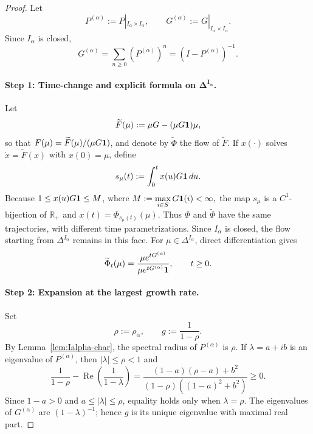 \documentclass[10pt,letterpaper]{article}
\theoremstyle{compactplain}
\theoremstyle{compactdefinition}
\newcommand{\1}{\mathds{1}}
\begin{document}
\begin{proof}
Let
\[
P^{(\alpha)}:=P|_{I_\alpha\times I_\alpha},
\qquad
G^{(\alpha)}:=G|_{I_\alpha\times I_\alpha}.
\]
Since $I_\alpha$ is closed,
\[
G^{(\alpha)}
=
\sum_{n\geq0}(P^{(\alpha)})^n
=
(I-P^{(\alpha)})^{-1}.
\]

\paragraph{Step 1: Time-change and explicit formula on $\boldsymbol{\Delta^{I_\alpha}}$.}
Let
\[
\widetilde F(\mu):=\mu G-(\mu G{\bf 1})\mu,
\]
so that $F(\mu)=\widetilde F(\mu)/(\mu G{\bf 1})$, and denote by
$\widetilde\Phi$ the flow of $\widetilde F$. If $x(\cdot)$ solves
$\dot x=\widetilde F(x)$ with $x(0)=\mu$, define
\[
s_\mu(t):=\int_0^t x(u)G{\bf 1}\,du.
\]
Because $1\leq x(u)G{\bf 1}\leq M$, where
\(
M:=\max\limits_{i\in S}G{\bf 1}(i)<\infty,
\)
the map $s_\mu$ is a $C^1$-bijection of $\mathbb R_+$ and
$x(t)=\Phi_{s_\mu(t)}(\mu)$. Thus $\Phi$ and $\widetilde\Phi$ have the same
trajectories, with different time parametrizations. Since $I_\alpha$ is
closed, the flow starting from $\Delta^{I_\alpha}$ remains in this face. For
$\mu\in\Delta^{I_\alpha}$, direct differentiation gives
\[
\widetilde\Phi_t(\mu)
=
\frac{\mu e^{tG^{(\alpha)}}}
     {\mu e^{tG^{(\alpha)}}{\bf 1}},
\qquad t\geq0.
\]


\paragraph{Step 2: Expansion at the largest growth rate.}
Set
\[
\rho:=\rho_\alpha,
\qquad
g:=\frac{1}{1-\rho}.
\]
By Lemma~\ref{lem:Ialpha-char}, the spectral radius of $P^{(\alpha)}$ is
$\rho$. If $\lambda=a+ib$ is an eigenvalue of $P^{(\alpha)}$, then
$|\lambda|\leq\rho<1$ and
\[
\frac{1}{1-\rho}
-
\operatorname{Re}\left(\frac{1}{1-\lambda}\right)
=
\frac{(1-a)(\rho-a)+b^2}
     {(1-\rho)((1-a)^2+b^2)}
\geq0.
\]
Since $1-a>0$ and $a\leq|\lambda|\leq\rho$, equality holds only when
$\lambda=\rho$. The eigenvalues of $G^{(\alpha)}$ are
$(1-\lambda)^{-1}$; hence $g$ is its unique eigenvalue with maximal real
part.


\end{proof}
\end{document}
